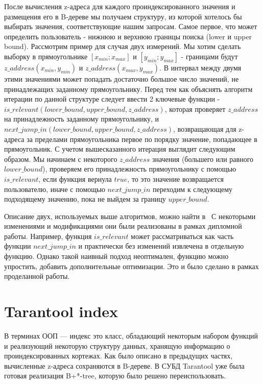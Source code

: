 После вычисления z-адреса для каждого проиндексированного значения и размещения его в B-дереве мы получаем структуру, из которой хотелось бы выбирать значения, соответствующие нашим запросам. Самое первое, что может определить пользователь - нижнюю и верхнюю границы поиска (lower и upper bound). Рассмотрим пример для случая двух измерений. Мы хотим сделать выборку в прямоугольнике $[x_{min};x_{max}]$ и $[y_{min}; y_{max}]$ - границами будут $z\_address(x_{min}, y_{min})$ и $z\_address(x_{max}, y_{max})$. В интервал между двумя этими значениями может попадать достаточно большое число значений, не принадлежащих заданному прямоугольнику. Перед тем как объяснять алгоритм итерации по данной структуре следует ввести 2 ключевые функции - $is\_relevant(lower\_bound, upper\_bound, z\_address)$, которая проверяет $z\_address$ на принадлежность заданному прямоугольнику, и $next\_jump\_in(lower\_bound, upper\_bound, z\_address)$, возвращающая для z-адреса за пределами прямоугольника первое по порядку значение, попадающее в прямоугольник.
С учетом вышесказанного итерация выглядит следующим образом. Мы начинаем с некоторого $z\_address$ значения (большего или равного $lower\_bound$), проверяем его принадлежность прямоугольнику с помощью  $is\_relevant$, если функция вернула $true$, то это значение возвращается пользователю, иначе с помощью $next\_jump\_in$ переходим к следующему подходящему значению, пока не выйдем за границу $upper\_bound$.

Описание двух, используемых выше алгоритмов, можно найти в~\cite{ramsak2000integrating, widhopf2005advanced, prukl2007relavcni} С некоторыми изменениями и модификациями они были реализованы в рамках дипломной работы. Например, функция $is\_relevant$ может рассматриваться как часть функции $next\_jump\_in$ и практически без изменений извлечена в отдельную функцию. Однако такой наивный подход неоптимален, функцию можно упростить, добавить дополнительные оптимизации. Это и было сделано в рамках проделанной работы.

\section{Tarantool index}
В терминах ООП --- индекс это класс, обладающий некоторым набором функций и реализующий некоторую структуру данных, хранящую информацию о проиндексированных кортежах.
Как было описано в предыдущих частях, вычисленные z-адреса сохраняются в B-дереве. В СУБД Tarantool уже была готовая реализация B+*-tree, которую было решено переиспользовать.

